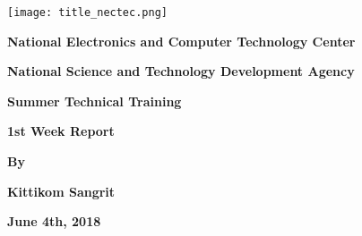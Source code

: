 \begin{titlepage}
    \begin{center}
    \large
    	\begin{center}
        \texttt{[image: title\_nectec.png]}
        \end{center}
        \vspace{0.5cm}
        \textbf{National Electronics and Computer Technology Center} \par
        \vspace{0.5cm}

        \textbf{National Science and Technology Development Agency}

        \vspace{3cm}

        \vspace{0.5cm}

        \textbf{Summer Technical Training}
        \vspace{0.5cm}

        \textbf{1st Week Report}

        \vspace{2cm}
        \textbf{By}
        \vspace{0.5cm}

        \textbf{Kittikom Sangrit}
        \vspace{0.25cm}

        \vspace{3cm}
        \textbf{June 4th, 2018}
    \end{center}
\end{titlepage}
